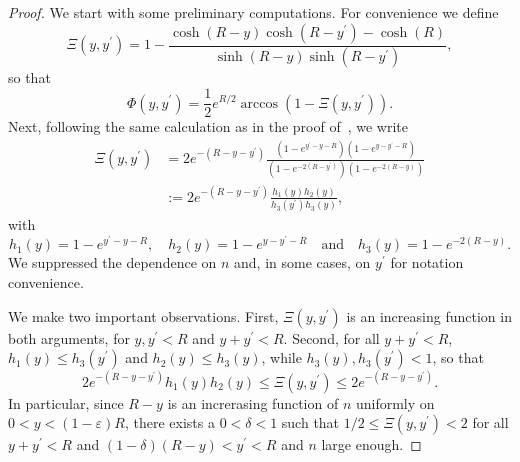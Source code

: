 \begin{proof}
We start with some preliminary computations. For convenience we define
\[
	\Xi(y,y^\prime) = 1 - \frac{\cosh(R- y)\cosh(R-y^\prime) - \cosh(R)}{\sinh(R - y) \sinh(R - y^\prime)},
\]
so that
\[
	\Phi(y, y^\prime) = \frac{1}{2}e^{R/2} \arccos\left(1 - \Xi(y,y^\prime)\right).
\]
Next, following the same calculation as in the proof of~\cite[Lemma 28]{fountoulakis2018law}, we write
\begin{align*}
	\Xi(y,y^\prime)
	&= 2 e^{-(R - y - y^\prime)} \frac{\left(1 - e^{y^\prime - y - R}\right)\left(1 - e^{y - y^\prime - R}\right)}
		{\left(1 - e^{-2(R - y^\prime)}\right)\left(1 - e^{-2(R- y)}\right)}\\
	&:= 2 e^{-(R - y - y^\prime)} \frac{h_1(y) h_2(y)}{h_3(y^\prime) h_3(y)},
\end{align*}
with
\[
	h_1(y) = 1 - e^{y^\prime - y - R}, \quad h_2(y) = 1 - e^{y - y^\prime - R}
	\quad \text{and} \quad h_3(y) = 1 - e^{-2(R- y)}.
\]
We suppressed the dependence on $n$ and, in some cases, on $y^\prime$ for notation convenience.

We make two important observations. First, $\Xi(y,y^\prime)$ is an increasing function in both arguments, for $y, y^\prime < R$ and $y + y^\prime < R$. Second, for all $y + y^\prime < R$, $h_1(y) \le h_3(y^\prime)$ and $h_2(y) \le h_3(y)$, while $h_3(y), h_3(y^\prime) < 1$, so that
\begin{equation}\label{eq:derivative_hyp_ball_Xi_bounds}
	2 e^{-(R - y - y^\prime)}h_1(y) h_2(y) \le \Xi(y,y^\prime) \le 2 e^{-(R - y - y^\prime)}.
\end{equation}
In particular, since $R-y$ is an increrasing function of $n$ uniformly on $0 < y < (1-\varepsilon)R$, there exists a $0 < \delta < 1$ such that $1/2 \le \Xi(y,y^\prime) < 2$ for all $y + y^\prime < R$ and $(1-\delta)(R-y) < y^\prime < R$ and $n$ large enough.


\end{proof}
